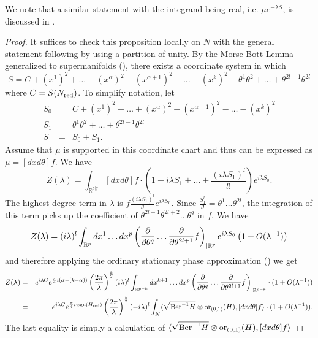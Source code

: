 \documentclass[11pt]{amsart}
\numberwithin{equation}{section}
\numberwithin{figure}{section}
\theoremstyle{plain}
\theoremstyle{definition}
\theoremstyle{remark}
\begin{document}
We note that a similar statement with the integrand being real, i.e.
$\mu e^{-\lambda S}$, is discussed in \cite{Schwarz_Semiclassical_approximation}.
\begin{proof}
It suffices to check this proposition locally on $N$ with the general
statement following by using a partition of unity. By the Morse-Bott
Lemma generalized to supermanifolds (),
there exists a coordinate system in which 
\[
S=C+\left(x^{1}\right)^{2}+\dots+\left(x^{\alpha}\right)^{2}-\left(x^{\alpha+1}\right)^{2}-\dots-\left(x^{k}\right)^{2}+\theta^{1}\theta^{2}+\dots+\theta^{2l-1}\theta^{2l}
\]
where $C=S(N_{\mathrm{red}})$. To simplify notation, let 
\begin{eqnarray*}
S_{0} & = & C+\left(x^{1}\right)^{2}+\dots+\left(x^{\alpha}\right)^{2}-\left(x^{\alpha+1}\right)^{2}-\dots-\left(x^{k}\right)^{2}\\
S_{1} & = & \theta^{1}\theta^{2}+\dots+\theta^{2l-1}\theta^{2l}\\
S & = & S_{0}+S_{1}.
\end{eqnarray*}
Assume that $\mu$ is supported in this coordinate chart and thus
can be expressed as $\mu=[dxd\theta]f$. We have
\[
Z(\lambda)=\int_{\mathbb{R}^{p|q}}[dxd\theta]f\cdot(1+i\lambda S_{1}+\dots+\frac{(i\lambda S_{1})^{l}}{l!})e^{i\lambda S_{0}}.
\]
The highest degree term in $\lambda$ is $f\frac{(i\lambda S_{1})^{l}}{l!}e^{i\lambda S_{0}}$.
Since $\frac{S_{1}^{l}}{l!}=\theta^{1}\dots\theta^{2l}$, the integration
of this term picks up the coefficient of $\theta^{2l+1}\theta^{2l+2}\dots\theta^{q}$
in $f$. We have 
\[
Z(\lambda)=(i\lambda)^{l}\int_{\mathbb{R}^{p}}dx^{1}\dots dx^{p}\left(\frac{\partial}{\partial\theta^{q}}\dots\frac{\partial}{\partial\theta^{2l+1}}f\right)_{|\mathbb{R}^{p}}e^{i\lambda S_{0}}\left(1+O(\lambda^{-1})\right)
\]
and therefore applying the ordinary stationary phase approximation
() we get 
\begin{eqnarray*}
Z(\lambda) & = & e^{i\lambda C}e^{\frac{\pi}{4}i\left(\alpha-(k-\alpha)\right)}\left(\frac{2\pi}{\lambda}\right)^{\frac{k}{2}}(i\lambda)^{l}\int_{\mathbb{R}^{p-k}}dx^{k+1}\dots dx^{p}\left(\frac{\partial}{\partial\theta^{q}}\dots\frac{\partial}{\partial\theta^{2l+1}}f\right)_{|\mathbb{R}^{p-k}}\cdot(1+O(\lambda^{-1}))\\
 & = & e^{i\lambda C}e^{\frac{\pi}{4}i\cdot\mathrm{sgn}(H_{\mathrm{red}})}\left(\frac{2\pi}{\lambda}\right)^{\frac{k}{2}}(-i\lambda)^{l}\int_{N}\langle\sqrt{\mathrm{Ber}^{-1}H}\otimes\mathrm{or}_{(0,1)}(H),[dxd\theta]f\rangle\cdot(1+O(\lambda^{-1})).
\end{eqnarray*}
The last equality is simply a calculation of $\langle\sqrt{\mathrm{Ber}^{-1}H}\otimes\mathrm{or}_{(0,1)}(H),[dxd\theta]f\rangle$

\end{proof}
\end{document}

